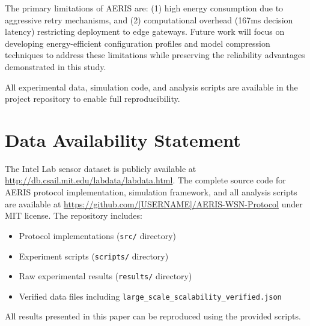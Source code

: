 \documentclass[sensors,article,submit,moreauthors,pdftex]{Definitions/mdpi}
\begin{document}
The primary limitations of AERIS are: (1) high energy consumption due to aggressive retry mechanisms, and (2) computational overhead (167ms decision latency) restricting deployment to edge gateways. Future work will focus on developing energy-efficient configuration profiles and model compression techniques to address these limitations while preserving the reliability advantages demonstrated in this study.

All experimental data, simulation code, and analysis scripts are available in the project repository to enable full reproducibility.

\vspace{6pt}




\section*{Data Availability Statement}
The Intel Lab sensor dataset is publicly available at \url{http://db.csail.mit.edu/labdata/labdata.html}. The complete source code for AERIS protocol implementation, simulation framework, and all analysis scripts are available at \url{https://github.com/[USERNAME]/AERIS-WSN-Protocol} under MIT license. The repository includes:
\begin{itemize}
\item Protocol implementations (\texttt{src/} directory)
\item Experiment scripts (\texttt{scripts/} directory)
\item Raw experimental results (\texttt{results/} directory)
\item Verified data files including \texttt{large\_scale\_scalability\_verified.json}
\end{itemize}
All results presented in this paper can be reproduced using the provided scripts.

\end{document}
